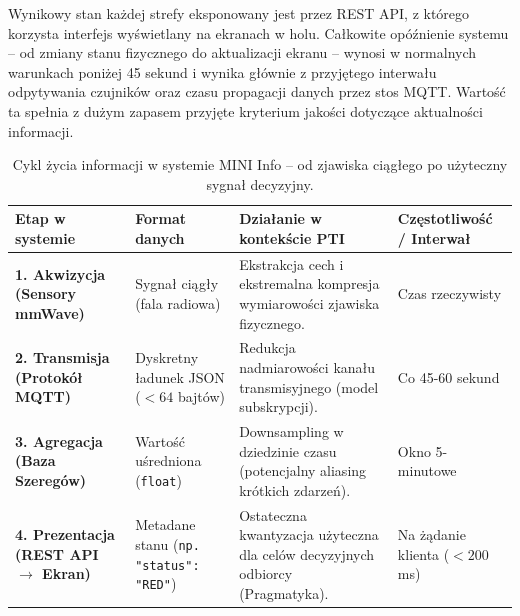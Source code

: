 \documentclass[14pt,a4paper]{extarticle}
\begin{document}
Wynikowy stan każdej strefy eksponowany jest przez REST API, z którego korzysta interfejs wyświetlany na ekranach w holu. Całkowite opóźnienie systemu -- od zmiany stanu fizycznego do aktualizacji ekranu -- wynosi w normalnych warunkach poniżej 45 sekund i wynika głównie z przyjętego interwału odpytywania czujników oraz czasu propagacji danych przez stos MQTT. Wartość ta spełnia z dużym zapasem przyjęte kryterium jakości dotyczące aktualności informacji.
\begin{table}[H]
    \centering
    \renewcommand{\arraystretch}{1.4}
    \begin{tabular}{|>{\raggedright\arraybackslash}p{3cm}|>{\raggedright\arraybackslash}p{3.5cm}|>{\raggedright\arraybackslash}p{4cm}|>{\raggedright\arraybackslash}p{3.5cm}|}
    \hline
    \rowcolor{gray!20}
    \textbf{Etap w systemie} & \textbf{Format danych} & \textbf{Działanie w kontekście PTI} & \textbf{Częstotliwość / Interwał} \\ \hline
    \textbf{1. Akwizycja \newline (Sensory mmWave)} & Sygnał ciągły \newline (fala radiowa) & Ekstrakcja cech i ekstremalna kompresja wymiarowości zjawiska fizycznego. & Czas rzeczywisty \\ \hline
    \textbf{2. Transmisja \newline (Protokół MQTT)} & Dyskretny ładunek JSON \newline ($<64$ bajtów) & Redukcja nadmiarowości kanału transmisyjnego (model subskrypcji). & Co 45-60 sekund \\ \hline
    \textbf{3. Agregacja \newline (Baza Szeregów)} & Wartość uśredniona \newline (\texttt{float}) & Downsampling w dziedzinie czasu (potencjalny aliasing krótkich zdarzeń). & Okno 5-minutowe \\ \hline
    \textbf{4. Prezentacja \newline (REST API $\rightarrow$ Ekran)} & Metadane stanu \newline (\texttt{np. "status": "RED"}) & Ostateczna kwantyzacja użyteczna dla celów decyzyjnych odbiorcy (Pragmatyka). & Na żądanie klienta ($<200$ ms) \\ \hline
    \end{tabular}
    \vspace{0.2cm}
    \caption{Cykl życia informacji w systemie MINI Info -- od zjawiska ciągłego po użyteczny sygnał decyzyjny.}
    \label{tab:cykl_zycia_informacji}
\end{table}
\end{document}
